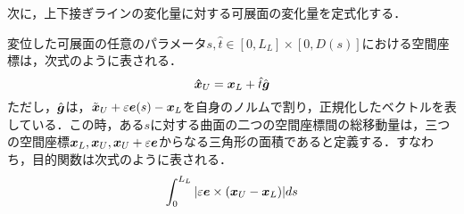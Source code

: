 		次に，上下接ぎラインの変化量に対する可展面の変化量を定式化する．
		
		変位した可展面の任意のパラメータ$ s,\hat{t} \in [0,L_L] \times [0,D(s)] $における空間座標は，次式のように表される．
		\begin{equation}\label{eq:Sur_eqhat}
			\boldsymbol{\hat{x}}_U = \boldsymbol{x}_L + \hat{t} \hat{\boldsymbol{g}}
		\end{equation}
		ただし，$ \hat{\boldsymbol{g}}$は，$ \tilde{\boldsymbol{x}}_U + \varepsilon \boldsymbol{e}(s) - \boldsymbol{x}_L $を自身のノルムで割り，正規化したベクトルを表している．この時，ある$s$に対する曲面の二つの空間座標間の総移動量は，三つの空間座標$ \boldsymbol{x}_L,\boldsymbol{x}_U,\boldsymbol{x}_U + \varepsilon \boldsymbol{e} $からなる三角形の面積であると定義する．すなわち，目的関数は次式のように表される．
		\begin{equation}\label{eq:Objective}
			\int_{0}^{L_L} |\varepsilon \boldsymbol{e} \times (\boldsymbol{x}_U - \boldsymbol{x}_L) | ds
		\end{equation}